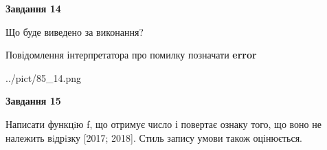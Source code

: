 \documentclass[11pt, ukrainian]{article}
\begin{document}
{\begin {large}
{\begin {center}\textbf{Завдання 14}\end {center}}\par
Що буде виведено за виконання? \par
Повідомлення інтерпретатора про помилку позначати \textbf{error}

\begin{center}
	{../pict/85_14.png}
\end{center}
\newpage

{\begin {center}\textbf{Завдання 15}\end {center}}\par

Написати функцiю f, що отримує число і повертає ознаку того, що воно не належить вiдрiзку [2017; 2018]. Стиль запису умови також оцінюється.\par
\newpage

\end {large}}
\end{document}
